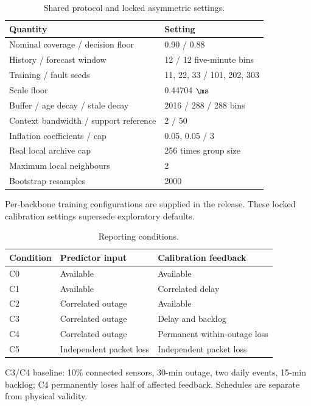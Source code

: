 \begin{table}[p]
\caption{Shared protocol and locked asymmetric settings.}\label{tab:settings}
\centering\small
\begin{tabular}{ll}\toprule
Quantity & Setting \\\midrule
Nominal coverage / decision floor & 0.90 / 0.88 \\
History / forecast window & 12 / 12 five-minute bins \\
Training / fault seeds & 11, 22, 33 / 101, 202, 303 \\
Scale floor & 0.44704 $\ms$ \\
Buffer / age decay / stale decay & 2016 / 288 / 288 bins \\
Context bandwidth / support reference & 2 / 50 \\
Inflation coefficients / cap & 0.05, 0.05 / 3 \\
Real local archive cap & 256 times group size \\
Maximum local neighbours & 2 \\
Bootstrap resamples & 2000 \\
\bottomrule\end{tabular}
\par\smallskip\footnotesize Per-backbone training configurations are supplied in the release. These locked calibration settings supersede exploratory defaults.
\end{table}\clearpage
\begin{table}[p]
\caption{Reporting conditions.}\label{tab:conditions}
\centering\small
\begin{tabular}{lll}\toprule
Condition & Predictor input & Calibration feedback \\\midrule
C0 & Available & Available \\
C1 & Available & Correlated delay \\
C2 & Correlated outage & Available \\
C3 & Correlated outage & Delay and backlog \\
C4 & Correlated outage & Permanent within-outage loss \\
C5 & Independent packet loss & Independent packet loss \\
\bottomrule\end{tabular}
\par\smallskip\footnotesize C3/C4 baseline: 10\% connected sensors, 30-min outage, two daily events, 15-min backlog; C4 permanently loses half of affected feedback. Schedules are separate from physical validity.
\end{table}\clearpage
